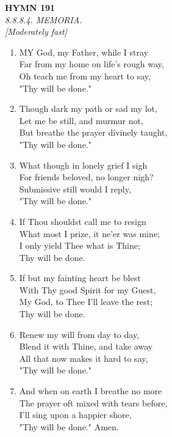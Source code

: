 \newpage
\begin{center}
    {\Large \textbf{HYMN 191}}
    \\
    \textit{8.8.8.4. MEMORIA.}
    \\
    \textit{\small [Moderately fast]}
\end{center}
\vspace{1em}

\begin{enumerate}
    \item MY God, my Father, while I stray \\
        Far from my home on life's rough way, \\
        Oh teach me from my heart to say, \\
        "Thy will be done."

    \item Though dark my path or sad my lot, \\
        Let me be still, and murmur not, \\
        But breathe the prayer divinely taught, \\
        "Thy will be done."

    \item What though in lonely grief I sigh \\
        For friends beloved, no longer nigh? \\
        Submissive still would I reply, \\
        "Thy will be done."

    \item If Thou shouldst call me to resign \\
        What most I prize, it ne'er was mine; \\
        I only yield Thee what is Thine; \\
        Thy will be done.

    \item If but my fainting heart be blest \\
        With Thy good Spirit for my Guest, \\
        My God, to Thee I'll leave the rest; \\
        Thy will be done.

    \item Renew my will from day to day, \\
        Blend it with Thine, and take away \\
        All that now makes it hard to say, \\
        "Thy will be done."

    \item And when on earth I breathe no more \\
        The prayer oft mixed with tears before, \\
        I'll sing upon a happier shore, \\
        "Thy will be done." Amen.

\end{enumerate}

